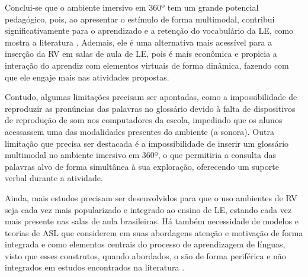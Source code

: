 Conclui-se que o ambiente imersivo em 360º tem um grande potencial pedagógico,
pois, ao apresentar o estímulo de forma multimodal, contribui
significativamente para o aprendizado e a retenção do vocabulário da LE, como
mostra a literatura \cite{chun1996,saito2015,procopio2016,mayer2001,monteiro2021}.
Ademais, ele é uma alternativa mais acessível para a
inserção da RV em salas de aula de LE, pois é mais econômica e propicia a
interação do aprendiz com elementos virtuais de forma dinâmica, fazendo com que
ele engaje mais nas atividades propostas.

Contudo, algumas limitações precisam ser apontadas, como a impossibilidade de
reproduzir as pronúncias das palavras no glossário devido à falta de
dispositivos de reprodução de som nos computadores da escola, impedindo que os
alunos acessassem uma das modalidades presentes do ambiente (a sonora). Outra
limitação que precisa ser destacada é a impossibilidade de inserir um glossário
multimodal no ambiente imersivo em 360º, o que permitiria a consulta das
palavras alvo de forma simultânea à sua exploração, oferecendo um suporte
verbal durante a atividade.

Ainda, mais estudos precisam ser desenvolvidos para que o uso ambientes de RV
seja cada vez mais popularizado e integrado ao ensino de LE, estando cada vez
mais presente nas salas de aula brasileiras. Há também necessidade de modelos e
teorias de ASL que considerem em suas abordagens atenção e motivação de forma
integrada e como elementos centrais do processo de aprendizagem de línguas,
visto que esses construtos, quando abordados, o são de forma periférica e não
integrados em estudos encontrados na literatura \cite{krashen1985,ellis1997,gass1997,hede2002,mayer2002,moreno2007,saito2015,monteiro2021}.
